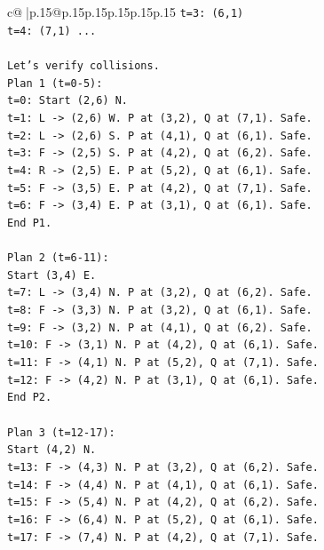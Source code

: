 \documentclass{article}
\begin{document}
{\begin{supertabular}{c@{$\;$}|p{.15\linewidth}@{}p{.15\linewidth}p{.15\linewidth}p{.15\linewidth}p{.15\linewidth}p{.15\linewidth}}
{{{\texttt{t=3: (6,1)} \\
\texttt{t=4: (7,1) ...} \\
\\ 
\texttt{Let's verify collisions.} \\
\texttt{Plan 1 (t=0{-}5):} \\
\texttt{t=0: Start (2,6) N.} \\
\texttt{t=1: L {-}> (2,6) W. P at (3,2), Q at (7,1). Safe.} \\
\texttt{t=2: L {-}> (2,6) S. P at (4,1), Q at (6,1). Safe.} \\
\texttt{t=3: F {-}> (2,5) S. P at (4,2), Q at (6,2). Safe.} \\
\texttt{t=4: R {-}> (2,5) E. P at (5,2), Q at (6,1). Safe.} \\
\texttt{t=5: F {-}> (3,5) E. P at (4,2), Q at (7,1). Safe.} \\
\texttt{t=6: F {-}> (3,4) E. P at (3,1), Q at (6,1). Safe.} \\
\texttt{End P1.} \\
\\ 
\texttt{Plan 2 (t=6{-}11):} \\
\texttt{Start (3,4) E.} \\
\texttt{t=7: L {-}> (3,4) N. P at (3,2), Q at (6,2). Safe.} \\
\texttt{t=8: F {-}> (3,3) N. P at (3,2), Q at (6,1). Safe.} \\
\texttt{t=9: F {-}> (3,2) N. P at (4,1), Q at (6,2). Safe.} \\
\texttt{t=10: F {-}> (3,1) N. P at (4,2), Q at (6,1). Safe.} \\
\texttt{t=11: F {-}> (4,1) N. P at (5,2), Q at (7,1). Safe.} \\
\texttt{t=12: F {-}> (4,2) N. P at (3,1), Q at (6,1). Safe.} \\
\texttt{End P2.} \\
\\ 
\texttt{Plan 3 (t=12{-}17):} \\
\texttt{Start (4,2) N.} \\
\texttt{t=13: F {-}> (4,3) N. P at (3,2), Q at (6,2). Safe.} \\
\texttt{t=14: F {-}> (4,4) N. P at (4,1), Q at (6,1). Safe.} \\
\texttt{t=15: F {-}> (5,4) N. P at (4,2), Q at (6,2). Safe.} \\
\texttt{t=16: F {-}> (6,4) N. P at (5,2), Q at (6,1). Safe.} \\
\texttt{t=17: F {-}> (7,4) N. P at (4,2), Q at (7,1). Safe.} \\
}}}
\end{supertabular}}
\end{document}
